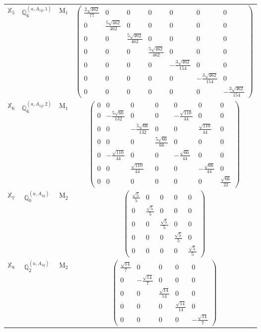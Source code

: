\documentclass[fleqn,10pt,landscape]{article}
\begin{document}
\begin{itemize}
\begin{center}
\begin{longtable}{c|c|c|c}
$ \mathbb{X}_{5} $ & $\mathbb{Q}_{6}^{(a,A_{1g},1)}$ & M$_{1}$ & $\begin{pmatrix} \frac{2 \sqrt{462}}{77} & 0 & 0 & 0 & 0 & 0 & 0 \\ 0 & \frac{5 \sqrt{462}}{462} & 0 & 0 & 0 & 0 & 0 \\ 0 & 0 & \frac{5 \sqrt{462}}{462} & 0 & 0 & 0 & 0 \\ 0 & 0 & 0 & \frac{5 \sqrt{462}}{462} & 0 & 0 & 0 \\ 0 & 0 & 0 & 0 & - \frac{3 \sqrt{462}}{154} & 0 & 0 \\ 0 & 0 & 0 & 0 & 0 & - \frac{3 \sqrt{462}}{154} & 0 \\ 0 & 0 & 0 & 0 & 0 & 0 & - \frac{3 \sqrt{462}}{154} \end{pmatrix}$ \\
$ \mathbb{X}_{6} $ & $\mathbb{Q}_{6}^{(a,A_{1g},2)}$ & M$_{1}$ & $\begin{pmatrix} 0 & 0 & 0 & 0 & 0 & 0 & 0 \\ 0 & - \frac{5 \sqrt{66}}{132} & 0 & 0 & - \frac{\sqrt{110}}{44} & 0 & 0 \\ 0 & 0 & - \frac{5 \sqrt{66}}{132} & 0 & 0 & \frac{\sqrt{110}}{44} & 0 \\ 0 & 0 & 0 & \frac{5 \sqrt{66}}{66} & 0 & 0 & 0 \\ 0 & - \frac{\sqrt{110}}{44} & 0 & 0 & - \frac{\sqrt{66}}{44} & 0 & 0 \\ 0 & 0 & \frac{\sqrt{110}}{44} & 0 & 0 & - \frac{\sqrt{66}}{44} & 0 \\ 0 & 0 & 0 & 0 & 0 & 0 & \frac{\sqrt{66}}{22} \end{pmatrix}$ \\ \hline
$ \mathbb{X}_{7} $ & $\mathbb{Q}_{0}^{(a,A_{1g})}$ & M$_{2}$ & $\begin{pmatrix} \frac{\sqrt{5}}{5} & 0 & 0 & 0 & 0 \\ 0 & \frac{\sqrt{5}}{5} & 0 & 0 & 0 \\ 0 & 0 & \frac{\sqrt{5}}{5} & 0 & 0 \\ 0 & 0 & 0 & \frac{\sqrt{5}}{5} & 0 \\ 0 & 0 & 0 & 0 & \frac{\sqrt{5}}{5} \end{pmatrix}$ \\
$ \mathbb{X}_{8} $ & $\mathbb{Q}_{2}^{(a,A_{1g})}$ & M$_{2}$ & $\begin{pmatrix} \frac{\sqrt{14}}{7} & 0 & 0 & 0 & 0 \\ 0 & - \frac{\sqrt{14}}{7} & 0 & 0 & 0 \\ 0 & 0 & \frac{\sqrt{14}}{14} & 0 & 0 \\ 0 & 0 & 0 & \frac{\sqrt{14}}{14} & 0 \\ 0 & 0 & 0 & 0 & - \frac{\sqrt{14}}{7} \end{pmatrix}$ \\

\end{longtable}
\end{center}
\end{itemize}
\end{document}

